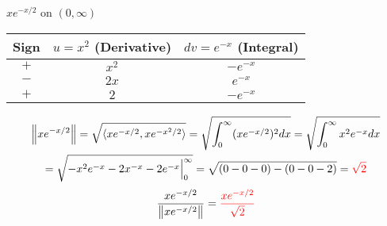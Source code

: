 \item [3.] $xe^{-x/2}$ on $(0,\infty)$\vspace{-5mm}
\begin{center}
\begin{tabular}{c|c|c}
Sign & \( u = x^2 \) (Derivative) & \( dv = e^{-x} \) (Integral) \\ 
\hline
\( + \) & \( x^2 \) & \( -e^{-x} \) \\
\( - \) & \( 2x \) & \( e^{-x} \) \\
\( + \) & \( 2 \) & \( -e^{-x} \)
\end{tabular}
\end{center}
\begin{gather*}
    \left \lVert xe^{-x/2} \right \rVert 
    = \sqrt{\langle xe^{-x/2}, xe^{-x^2/2} \rangle}
    = \sqrt{\int_0^\infty (xe^{-x/2})^2dx}
    = \sqrt{\int_0^\infty x^2e^{-x}dx}\\
    = \sqrt{ -x^2e^{-x} - 2x^{-x}-2e^{-x} \Big|_0^\infty}
    = \sqrt{(0 - 0 - 0)-(0 - 0 - 2)} 
    = \textcolor{red}{\sqrt{2}}
\end{gather*}
\begin{gather*}
    \frac{xe^{-x/2}}{\left \lVert xe^{-x/2} \right \rVert} 
    = \textcolor{red}{\frac{xe^{-x/2}}{\sqrt{2}}}
\end{gather*}